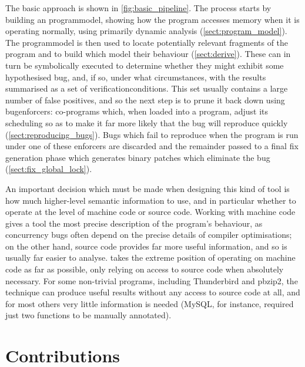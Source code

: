 The basic approach is shown in \autoref{fig:basic_pipeline}.  The
process starts by building an \gls{programmodel}, showing how the
program accesses memory when it is operating normally, using primarily
dynamic analysis (\autoref{sect:program_model}).  The
\gls{programmodel} is then used to locate potentially relevant
fragments of the program and to build {\StateMachines} which model
their behaviour (\autoref{sect:derive}).  These {\StateMachines} can
in turn be symbolically executed to determine whether they might
exhibit some hypothesised bug, and, if so, under what circumstances,
with the results summarised as a set of \glspl{verificationcondition}.
This set usually contains a large number of false positives, and so
the next step is to prune it back down using \glspl{bugenforcer}:
co-programs which, when loaded into a program, adjust its scheduling
so as to make it far more likely that the bug will reproduce quickly
(\autoref{sect:reproducing_bugs}).  Bugs which fail to reproduce when
the program is run under one of these enforcers are discarded and the
remainder passed to a final fix generation phase which generates
binary patches which eliminate the bug
(\autoref{sect:fix_global_lock}).

An important decision which must be made when designing this kind of
tool is how much higher-level semantic information to use, and in
particular whether to operate at the level of machine code or source
code.  Working with machine code gives a tool the most
precise description of the program's behaviour, as concurrency bugs
often depend on the precise details of compiler optimisations; on the
other hand, source code provides far more useful information, and so
is usually far easier to analyse.  {\Technique} takes the extreme
position of operating on machine code as far as possible, only relying
on access to source code when absolutely necessary.  For some
non-trivial programs, including Thunderbird and pbzip2, the technique
can produce useful results without any access to source code at all,
and for most others very little information is needed (MySQL, for
instance, required just two functions to be manually annotated).

\section{Contributions}

